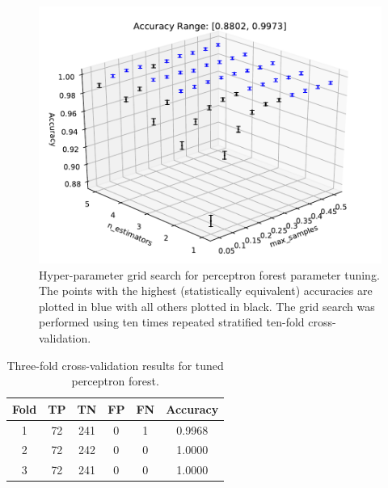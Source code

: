 \documentclass[paper=a4, fontsize=11pt]{scrartcl} %
\begin{document}
\begin{figure}[H]
	\centering
	\includegraphics[scale=0.6]{../output/PF/PF_941_486/PF_gridsearch_941_486_global_standard.pdf}
	\caption{Hyper-parameter grid search for perceptron forest parameter tuning.
		The points with the highest (statistically equivalent) accuracies are plotted in blue with all others plotted in black.
		The grid search was performed using ten times repeated stratified ten-fold cross-validation.}
	\label{fig: perc forest grid}
\end{figure}

\begin{table}[H]
	\centering
	\caption{Three-fold cross-validation results for tuned perceptron forest.}
	\begin{tabular}{|c|c|c|c|c|c|}
		\hline
		\textbf{Fold} & \textbf{TP} & \textbf{TN} & \textbf{FP} & \textbf{FN} & \textbf{Accuracy} \\ \hline \hline
		1 & 72 & 241 & 0 & 1 & 0.9968  \\ \hline
		2 & 72 & 242 & 0 & 0 & 1.0000  \\ \hline
		3 & 72 & 241 & 0 & 0 & 1.0000  \\ \hline
	\end{tabular}
	\label{tab: cv best perceptron forest}
\end{table}
\end{document}
